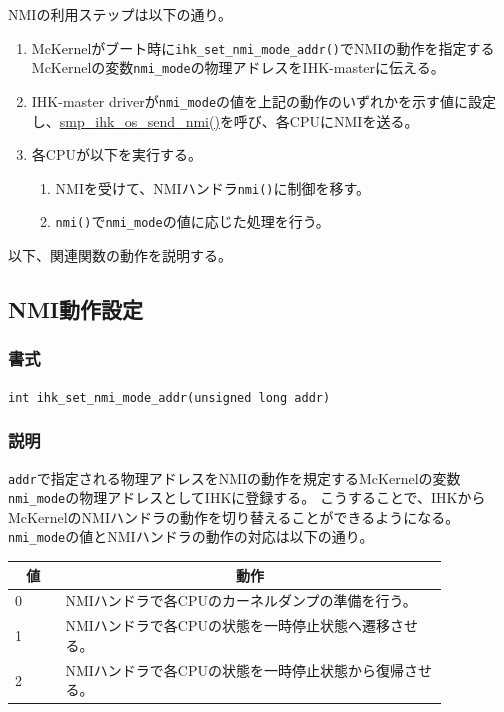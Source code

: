 \documentclass[twoside,11pt,fleqn]{book}
\newcommand\textttw[1]{\mathchardef\UrlBreakPenalty=100\mathchardef\UrlBigBreakPenalty=100\url{#1}}
\begin{document}
NMIの利用ステップは以下の通り。
\begin{enumerate}
\item McKernelがブート時に\texttt{ihk\_set\_nmi\_mode\_addr()}でNMIの動作を指定するMcKernelの変数\texttt{nmi\_mode}の物理アドレスをIHK-masterに伝える。
\item IHK-master driverが\texttt{nmi\_mode}の値を上記の動作のいずれかを示す値に設定し、\textttw{smp\_ihk\_os\_send\_nmi()}を呼び、各CPUにNMIを送る。
\item 各CPUが以下を実行する。
\begin{enumerate}
\item NMIを受けて、NMIハンドラ\texttt{nmi()}に制御を移す。
\item \texttt{nmi()}で\texttt{nmi\_mode}の値に応じた処理を行う。
\end{enumerate}
\end{enumerate}

以下、関連関数の動作を説明する。
\subsection{NMI動作設定}\label{sec:nmi_mode}
\subsubsection*{書式}{\quad} \texttt{int ihk\_set\_nmi\_mode\_addr(unsigned long addr)}
\subsubsection*{説明}{\quad} 
\texttt{addr}で指定される物理アドレスをNMIの動作を規定するMcKernelの変数\texttt{nmi\_mode}の物理アドレスとしてIHKに登録する。
こうすることで、IHKからMcKernelのNMIハンドラの動作を切り替えることができるようになる。
\texttt{nmi\_mode}の値とNMIハンドラの動作の対応は以下の通り。
\begin{table}[!h]
\footnotesize
\begin{tabular}{|p{0.10\linewidth}|p{0.76\linewidth}|} \hline
\multicolumn{1}{|c}{\textbf{値}}&\multicolumn{1}{|c|}{\textbf{動作}}\\ \hline \hline
0&
NMIハンドラで各CPUのカーネルダンプの準備を行う。
\\ \hline
1&NMIハンドラで各CPUの状態を一時停止状態へ遷移させる。
\\ \hline
2&NMIハンドラで各CPUの状態を一時停止状態から復帰させる。
\\ \hline
\end{tabular}
\vspace{-0em}
\end{table}
\FloatBarrier
\end{document}
